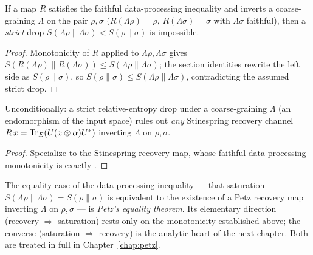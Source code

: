 \begin{theorem}\label{no_section_of_strict_relEntropy_drop}
  \leanok
  If a map \(R\) satisfies the faithful data-processing inequality and inverts a coarse-graining
  \(\Lambda\) on the pair \(\rho,\sigma\) (\(R(\Lambda\rho) = \rho\), \(R(\Lambda\sigma) = \sigma\)
  with \(\Lambda\sigma\) faithful), then a \emph{strict} drop
  \(S(\Lambda\rho\|\Lambda\sigma) < S(\rho\|\sigma)\) is impossible.
\end{theorem}
\begin{proof}\leanok
  Monotonicity of \(R\) applied to \(\Lambda\rho,\Lambda\sigma\) gives
  \(S(R(\Lambda\rho)\|R(\Lambda\sigma))\le S(\Lambda\rho\|\Lambda\sigma)\); the section identities
  rewrite the left side as \(S(\rho\|\sigma)\), so
  \(S(\rho\|\sigma)\le S(\Lambda\rho\|\Lambda\sigma)\), contradicting the assumed strict drop.
\end{proof}

\begin{corollary}\label{no_stinespring_section_of_strict_relEntropy_drop}
  \leanok
  Unconditionally: a strict relative-entropy drop under a coarse-graining \(\Lambda\) (an
  endomorphism of the input space) rules out \emph{any} Stinespring recovery channel
  \(R\,x = \operatorname{Tr}_E(U(x\otimes\alpha)U^{*})\) inverting \(\Lambda\) on \(\rho,\sigma\).
\end{corollary}
\begin{proof}\leanok
  Specialize  to the Stinespring recovery map, whose
  faithful data-processing monotonicity is exactly .
\end{proof}

The equality case of the data-processing inequality --- that saturation
\(S(\Lambda\rho\|\Lambda\sigma) = S(\rho\|\sigma)\) is equivalent to the existence of a Petz
recovery map inverting \(\Lambda\) on \(\rho,\sigma\) --- is \emph{Petz's equality theorem}. Its
elementary direction (recovery \(\Rightarrow\) saturation) rests only on the monotonicity
established above; the converse (saturation \(\Rightarrow\) recovery) is the analytic heart of the
next chapter. Both are treated in full in Chapter~\ref{chap:petz}.
